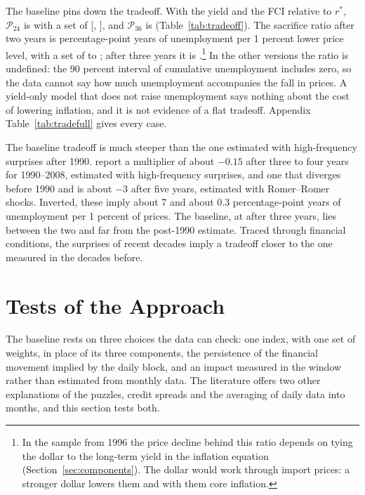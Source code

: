 \documentclass[11pt]{article}
\newcommand{\rs}{r^{*}}
\begin{document}


The baseline pins down the tradeoff. With the yield and the FCI relative to $\rs$, $\mathcal{P}_{24}$ is  with a set of [, ], and $\mathcal{P}_{36}$ is  (Table~\ref{tab:tradeoff}). The sacrifice ratio after two years is  percentage-point years of unemployment per 1 percent lower price level, with a set of  to ; after three years it is .\footnote{In the sample from 1996 the price decline behind this ratio depends on tying the dollar to the long-term yield in the inflation equation (Section~\ref{sec:components}). The dollar would work through import prices: a stronger dollar lowers them and with them core inflation.} In the other versions the ratio is undefined: the 90 percent interval of cumulative unemployment includes zero, so the data cannot say how much unemployment accompanies the fall in prices. A yield-only model that does not raise unemployment says nothing about the cost of lowering inflation, and it is not evidence of a flat tradeoff. Appendix Table~\ref{tab:tradefull} gives every case.

The baseline tradeoff is much steeper than the one estimated with high-frequency surprises after 1990. \citet{barnichon2021} report a multiplier of about $-0.15$ after three to four years for 1990--2008, estimated with high-frequency surprises, and one that diverges before 1990 and is about $-3$ after five years, estimated with Romer--Romer shocks. Inverted, these imply about 7 and about 0.3 percentage-point years of unemployment per 1 percent of prices. The baseline, at  after three years, lies between the two and far from the post-1990 estimate. Traced through financial conditions, the surprises of recent decades imply a tradeoff closer to the one measured in the decades before.

\FloatBarrier
\section{Tests of the Approach}\label{sec:tests}
The baseline rests on three choices the data can check: one index, with one set of weights, in place of its three components, the persistence of the financial movement implied by the daily block, and an impact measured in the window rather than estimated from monthly data. The literature offers two other explanations of the puzzles, credit spreads and the averaging of daily data into months, and this section tests both.
\end{document}
